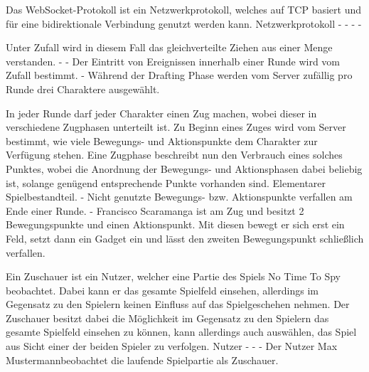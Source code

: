 {Das WebSocket-Protokoll ist ein Netzwerkprotokoll, welches auf TCP basiert und für eine bidirektionale Verbindung genutzt werden kann.}
{Netzwerkprotokoll}
{-}
{-}
{-}
{-}

{Unter Zufall wird in diesem Fall das gleichverteilte Ziehen aus einer Menge verstanden.}
{-}
{-}
{Der Eintritt von Ereignissen innerhalb einer Runde wird vom Zufall bestimmt.}
{-}
{Während der Drafting Phase werden vom Server zufällig pro Runde drei Charaktere ausgewählt.}

{In jeder Runde darf jeder Charakter einen Zug machen, wobei dieser in verschiedene Zugphasen unterteilt ist. Zu Beginn eines Zuges wird vom Server bestimmt, wie viele Bewegungs- und Aktionspunkte dem Charakter zur Verfügung stehen. Eine Zugphase beschreibt nun den Verbrauch eines solches Punktes, wobei die Anordnung der Bewegungs- und Aktionsphasen dabei beliebig ist, solange genügend entsprechende Punkte vorhanden sind.}
{Elementarer Spielbestandteil.}
{-}
{Nicht genutzte Bewegungs- bzw. Aktionspunkte verfallen am Ende einer Runde.}
{-}
{Francisco Scaramanga ist am Zug und besitzt 2 Bewegungspunkte und einen Aktionspunkt. Mit diesen bewegt er sich erst ein Feld, setzt dann ein Gadget ein und lässt den zweiten Bewegungspunkt schließlich verfallen.}

{Ein Zuschauer ist ein Nutzer, welcher eine Partie des Spiels \glqq{}No Time To Spy\grqq{} beobachtet. Dabei kann er das gesamte Spielfeld einsehen, allerdings im Gegensatz zu den Spielern keinen Einfluss auf das Spielgeschehen nehmen. Der Zuschauer besitzt dabei die Möglichkeit im Gegensatz zu den Spielern das gesamte Spielfeld einsehen zu können, kann allerdings auch auswählen, das Spiel aus Sicht einer der beiden Spieler zu verfolgen.}
{Nutzer}
{-}
{-}
{-}
{Der Nutzer \glqq Max Mustermann\grqq beobachtet die laufende Spielpartie als Zuschauer.}

